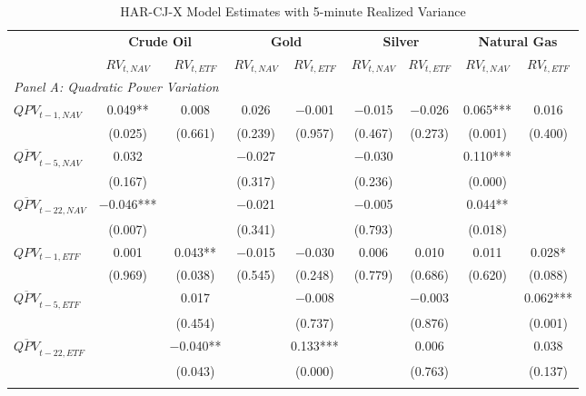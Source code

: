 \begin{landscape}
\begin{table}[htbp]
\centering
\caption{HAR-CJ-X Model Estimates with 5-minute Realized Variance}
\label{tab:HAR_CJ_5min}
\begin{threeparttable}
\footnotesize
\begin{tabular}{@{}lcccccccc@{}}
\toprule
 & \multicolumn{2}{c}{\textbf{Crude Oil}} & \multicolumn{2}{c}{\textbf{Gold}} & \multicolumn{2}{c}{\textbf{Silver}} & \multicolumn{2}{c}{\textbf{Natural Gas}} \\
\cmidrule(lr){2-3} \cmidrule(lr){4-5} \cmidrule(lr){6-7} \cmidrule(lr){8-9}
 & $RV_{t,NAV}$ & $RV_{t,ETF}$ & $RV_{t,NAV}$ & $RV_{t,ETF}$ & $RV_{t,NAV}$ & $RV_{t,ETF}$ & $RV_{t,NAV}$ & $RV_{t,ETF}$ \\
\midrule
\multicolumn{9}{l}{\textit{Panel A: Quadratic Power Variation}} \\
\addlinespace[0.1cm]
$QPV_{t-1,NAV}$ & 0.049** & 0.008 & 0.026 & $-$0.001 & $-$0.015 & $-$0.026 & 0.065*** & 0.016 \\
                & (0.025) & (0.661) & (0.239) & (0.957) & (0.467) & (0.273) & (0.001) & (0.400) \\
\addlinespace[0.05cm]
$\overline{QPV}_{t-5,NAV}$ & 0.032 &  & $-$0.027 &  & $-$0.030 &  & 0.110*** &  \\
                          & (0.167) &  & (0.317) &  & (0.236) &  & (0.000) &  \\
\addlinespace[0.05cm]
$\overline{QPV}_{t-22,NAV}$ & $-$0.046*** &  & $-$0.021 &  & $-$0.005 &  & 0.044** &  \\
                           & (0.007) &  & (0.341) &  & (0.793) &  & (0.018) &  \\
\addlinespace[0.05cm]
$QPV_{t-1,ETF}$ & 0.001 & 0.043** & $-$0.015 & $-$0.030 & 0.006 & 0.010 & 0.011 & 0.028* \\
                & (0.969) & (0.038) & (0.545) & (0.248) & (0.779) & (0.686) & (0.620) & (0.088) \\
\addlinespace[0.05cm]
$\overline{QPV}_{t-5,ETF}$ &  & 0.017 &  & $-$0.008 &  & $-$0.003 &  & 0.062*** \\
                          &  & (0.454) &  & (0.737) &  & (0.876) &  & (0.001) \\
\addlinespace[0.05cm]
$\overline{QPV}_{t-22,ETF}$ &  & $-$0.040** &  & 0.133*** &  & 0.006 &  & 0.038 \\
                           &  & (0.043) &  & (0.000) &  & (0.763) &  & (0.137) \\
\addlinespace[0.2cm]


\end{tabular}
\end{threeparttable}
\end{table}
\end{landscape}
